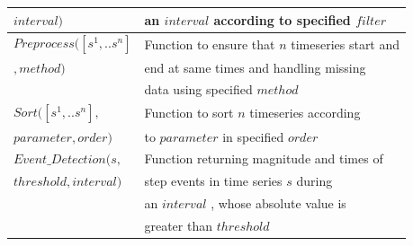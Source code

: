 \documentclass[conference]{IEEEtran}
\begin{document}
\begin{table}
\begin{tabular}{|l|l|}
$interval)$                                        & an $interval$ according to specified $filter$\\
\hline
$Preprocess([s^1,..s^n]$ & Function to ensure that $n$ timeseries start and\\
$,method)$                                        &end at same times and handling missing\\
                                        & data using specified $method$\\
\hline                                        
$Sort([s^1,..s^n],$ & Function to sort $n$ timeseries according\\
$parameter,order)$  &to $parameter$ in specified $order$\\
\hline
$Event\_Detection(s,$ & Function returning magnitude and times of \\
$threshold,interval)$                  &step events in time series $s$ during \\
                              &an $interval$ , whose absolute value is \\
                              & greater than $threshold$\\
                                                                               

\hline
%
\end{tabular}
\end{table}
\end{document}
